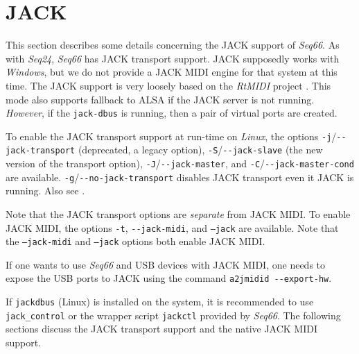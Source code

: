 %
%
%

\section{JACK}
\label{sec:jack}

   This section describes some details concerning the JACK support of
   \textsl{Seq66}.
   As with \textsl{Seq24}, \textsl{Seq66} has JACK transport support.
   JACK supposedly works with \textsl{Windows}, but we do not provide a JACK
   MIDI engine for that system at this time.
   The JACK support is very loosely based on the \textsl{RtMIDI} project
   \cite{rtmidi}.
   This mode also supports fallback to ALSA if the JACK server is not running.
   \textsl{However}, if the \texttt{jack-dbus} is running, then a pair of virtual
   ports are created.

   To enable the JACK transport support at run-time on
   \textsl{Linux}, the options
   \texttt{-j}/\texttt{-{}-jack-transport} (deprecated, a legacy option),
   \texttt{-S}/\texttt{-{}-jack-slave} (the new version of the transport
   option),
   \texttt{-J}/\texttt{-{}-jack-master},
   and \texttt{-C}/\texttt{-{}-jack-master-cond} are available.
   \texttt{-g}/\texttt{-{}-no-jack-transport}
   disables JACK transport even it JACK is running.
   Also see .

   Note that the JACK transport options are \textsl{separate} from JACK MIDI.
   To enable JACK MIDI, the options \texttt{-t}, \texttt{-{}-jack-midi},
   and \texttt{--jack} are available.
   Note that the \texttt{--jack-midi} and \texttt{--jack} options both
   enable JACK MIDI.

   If one wants to use \textsl{Seq66} and USB devices
   with JACK MIDI, one needs to expose the USB ports to JACK using the
   command \texttt{a2jmidid -{}-export-hw}.

   If \texttt{jackdbus} (Linux) is installed on the system, it is recommended
   to use \texttt{jack\_control} or the wrapper script \texttt{jackctl}
   provided by \textsl{Seq66}.
   The following sections discuss the JACK transport support and the native
   JACK MIDI support.

